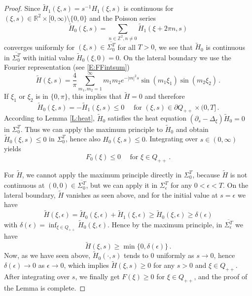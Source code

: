 \documentclass[10pt,a4paper]{amsart}
\newcommand\R{{\mathbb R}}
\newcommand\Z{{\mathbb Z}}
\begin{document}
\begin{proof}
Since $\tilde H_{1}(\xi,s)=s^{-1}H_{1}(\xi,s)$ is continuous for $(\xi,s)\in\R^{2}\times[0,\infty)\setminus\{0,0\}$ and the Poisson series 
$$
 \tilde H_{0}(\xi,s) =  \sum_{n\in\Z^{2},n\ne0} \tilde H_{1}(\xi+2\pi n,s)
$$
converges uniformly for $(\xi,s)\in\overline{\Sigma_{0}^{T}}$ for all $T>0$, we see that 
$\tilde H_{0}$ is continuous in $\overline{\Sigma_{0}^{T}}$ with initial value 
$\tilde H_{0}(\xi,0)=0$. 
On the lateral boundary we use the Fourier representation (see \eqref{E:FFintsum})
$$
 \tilde H(\xi,s) = \frac4\pi \sum_{m_{1},m_{2}=1}^{\infty}
    m_{1}m_{2} e^{-|m|^{2}s}
    \sin (m_{1}\xi_{1}) \sin(m_{2}\xi_{2})\,.
$$
If $\xi_{1}$ or $\xi_{2}$ is in $\{0,\pi\}$, this implies that $\tilde H=0$ and therefore
$$
 \tilde H_{0}(\xi,s) = -\tilde H_{1}(\xi,s)\le0 
 \quad\mbox{ for }(\xi,s)\in\partial Q_{++}\times(0,T]\,.
$$
According to Lemma \ref{L:heat}, $\tilde H_{0}$ satisfies the heat equation
$(\partial_{s}-\Delta_{\xi})\tilde H_{0}=0$ in $\Sigma_{0}^{T}$.
Thus we can apply the maximum principle to $\tilde H_{0}$ and obtain 
$\tilde H_{0}(\xi,s)\le0$ in $\Sigma_{0}^{T}$, hence also $H_{0}(\xi,s)\le0$.
Integrating over $s\in(0,\infty)$ yields
$$
 F_{0}(\xi) \le 0 \quad\mbox{ for }\xi\in Q_{++}\,.
$$

For $\tilde H$, we cannot apply the maximum principle directly in $\Sigma_{0}^{T}$, because $\tilde H$ is not continuous at $(0,0)\in\overline{\Sigma_{0}^{T}}$, but we can apply it in
$\Sigma_{\epsilon}^{T}$ for any $0<\epsilon<T$. On the lateral boundary, $\tilde H$ vanishes as seen above, and for the initial value at $s=\epsilon$ we have
$$
 \tilde H(\xi,\epsilon) = \tilde H_{0}(\xi,\epsilon) + \tilde H_{1}(\xi,\epsilon)
 \ge \tilde H_{0}(\xi,\epsilon) \ge \delta(\epsilon)
$$
with $\delta(\epsilon)=\inf_{\xi\in Q_{++}}\tilde H_{0}(\xi,\epsilon)$.
Hence by the maximum principle, in $\overline{\Sigma_{\epsilon}^{T}}$ we have 
$$
 \tilde H(\xi,s) \ge \min\{0,\delta(\epsilon)\}\,.
$$
Now, as we have seen above, $\tilde H_{0}(\cdot,s)$ tends to $0$ uniformly as $s\to0$, hence $\delta(\epsilon)\to0$ as $\epsilon\to0$, which implies $\tilde H(\xi,s)\ge0$ for any $s>0$ and $\xi\in Q_{++}$. After integrating over $s$, we finally get $F(\xi)\ge0$ for $\xi\in Q_{++}$, and the proof of the Lemma is complete.
\end{proof}
\end{document}
